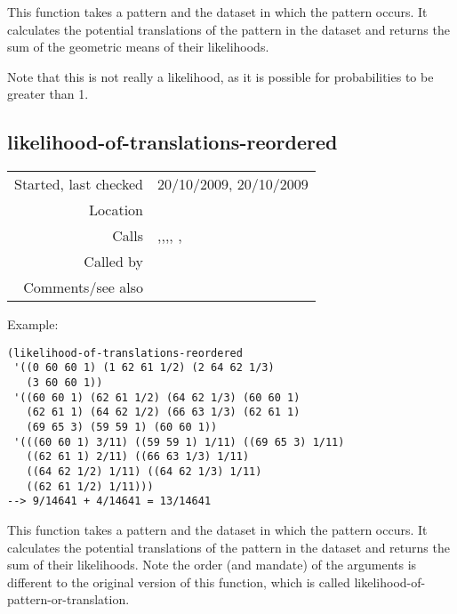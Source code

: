 \noindent This function takes a pattern and the
dataset in which the pattern occurs. It calculates the
potential translations of the pattern in the dataset
and returns the sum of the geometric means of their
likelihoods.

Note that this is not really a likelihood, as it is
possible for probabilities to be greater than 1.


\subsection*{likelihood-of-translations-reordered}\label{fun:likelihood-of-translations-reordered}

\vspace{0.3cm}
\begin{tabular}{r|p{8cm}}
Started, last checked & 20/10/2009, 20/10/2009 \\
Location & \nameref{sec:empirical-preliminaries} \\
Calls & \nameref{fun:constant-vector},\newline \nameref{fun:direct-product-of-n-sets},\newline \nameref{fun:likelihood-of-subset},\newline \nameref{fun:orthogonal-projection-not-unique-equalp}, \nameref{fun:potential-n-dim-translations}, \nameref{fun:translation} \\
Called by & \nameref{fun:evaluate-variables-of-pattern2hash} \\
Comments/see also &
\end{tabular}

\vspace{0.5cm}
\noindent Example:
\begin{verbatim}
(likelihood-of-translations-reordered
 '((0 60 60 1) (1 62 61 1/2) (2 64 62 1/3)
   (3 60 60 1))
 '((60 60 1) (62 61 1/2) (64 62 1/3) (60 60 1)
   (62 61 1) (64 62 1/2) (66 63 1/3) (62 61 1)
   (69 65 3) (59 59 1) (60 60 1))
 '(((60 60 1) 3/11) ((59 59 1) 1/11) ((69 65 3) 1/11)
   ((62 61 1) 2/11) ((66 63 1/3) 1/11)
   ((64 62 1/2) 1/11) ((64 62 1/3) 1/11)
   ((62 61 1/2) 1/11)))
--> 9/14641 + 4/14641 = 13/14641
\end{verbatim}

\noindent This function takes a pattern and the
dataset in which the pattern occurs. It calculates the
potential translations of the pattern in the dataset
and returns the sum of their likelihoods. Note the
order (and mandate) of the arguments is different to
the original version of this function, which is called
likelihood-of-pattern-or-translation.


